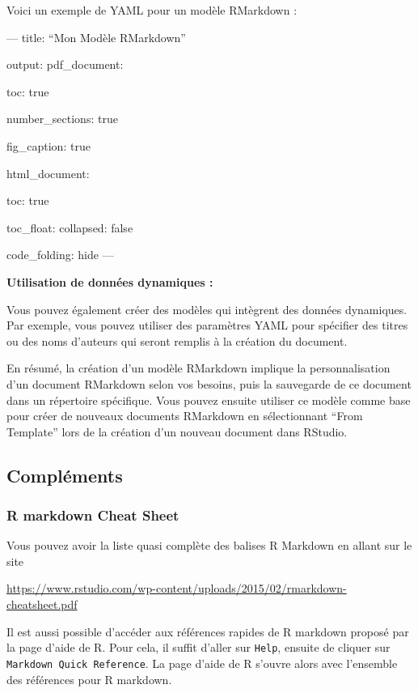 \documentclass[
  12pt,
]{article}
\begin{document}
Voici un exemple de YAML pour un modèle RMarkdown :

--- title: ``Mon Modèle RMarkdown''

output: pdf\_document:

toc: true

number\_sections: true

fig\_caption: true

html\_document:

toc: true

toc\_float: collapsed: false

code\_folding: hide ---

\textbf{Utilisation de données dynamiques :}

Vous pouvez également créer des modèles qui intègrent des données
dynamiques. Par exemple, vous pouvez utiliser des paramètres YAML pour
spécifier des titres ou des noms d'auteurs qui seront remplis à la
création du document.

En résumé, la création d'un modèle RMarkdown implique la
personnalisation d'un document RMarkdown selon vos besoins, puis la
sauvegarde de ce document dans un répertoire spécifique. Vous pouvez
ensuite utiliser ce modèle comme base pour créer de nouveaux documents
RMarkdown en sélectionnant ``From Template'' lors de la création d'un
nouveau document dans RStudio.

\subsection{Compléments}\label{compluxe9ments}

\subsubsection{R markdown Cheat Sheet}\label{r-markdown-cheat-sheet}

Vous pouvez avoir la liste quasi complète des balises R Markdown en
allant sur le site

\url{https://www.rstudio.com/wp-content/uploads/2015/02/rmarkdown-cheatsheet.pdf}

Il est aussi possible d'accéder aux références rapides de R markdown
proposé par la page d'aide de R. Pour cela, il suffit d'aller sur
\texttt{Help}, ensuite de cliquer sur
\texttt{Markdown\ Quick\ Reference}. La page d'aide de R s'ouvre alors
avec l'ensemble des références pour R markdown.
\end{document}

